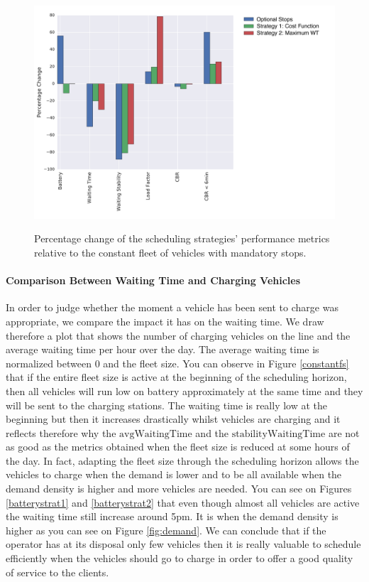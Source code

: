\documentclass[12pt,a4paper]{article}
\begin{document}
\begin{figure}[h] 
  \centering
  \caption{Percentage change of the scheduling strategies' performance metrics relative to the constant fleet of vehicles with mandatory stops.}
\includegraphics[scale=0.55]{./images/strategyCompare.pdf}
\label{strategyCompare}
\end{figure}

\paragraph{Comparison Between Waiting Time and Charging Vehicles}
In order to judge whether the moment a vehicle has been sent to charge was appropriate, we compare the impact it has on the waiting time. We draw therefore a plot that shows the number of charging vehicles on the line and the average waiting time per hour over the day. The average waiting time is normalized between 0 and the fleet size. You can observe in Figure \ref{constantfs} that if the entire fleet size is active at the beginning of the scheduling horizon, then all vehicles will run low on battery approximately at the same time and they will be sent to the charging stations. The waiting time is really low at the beginning but then it increases drastically whilst vehicles are charging and it reflects therefore why the $\text{avgWaitingTime}$ and the $\text{stabilityWaitingTime}$ are not as good as the metrics obtained when the fleet size is reduced at some hours of the day. In fact, adapting the fleet size through the scheduling horizon allows the vehicles to charge when the demand is lower and to be all available when the demand density is higher and more vehicles are needed. You can see on Figures \ref{batterystrat1} and \ref{batterystrat2} that even though almost all vehicles are active the waiting time still increase around 5pm. It is when the demand density is higher as you can see on Figure \ref{fig:demand}. We can conclude that if the operator has at its disposal only few vehicles then it is really valuable to schedule efficiently when the vehicles should go to charge in order to offer a good quality of service to the clients. 
\end{document}

